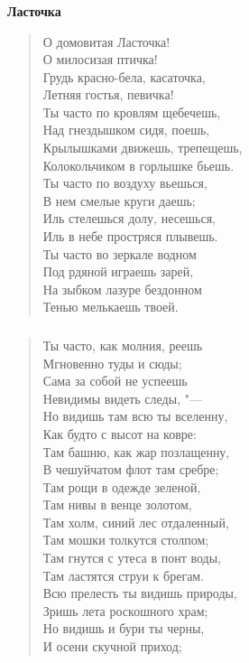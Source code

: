 \documentclass{beamer}
\begin{document}
\begin{frame}
\frametitle{}
\begin{center}
\textbf{Ласточка}
\end{center}

\begin{verse}
О домовитая Ласточка!\\	
О милосизая птичка!	\\			
Грудь красно-бела, касаточка,\\			
Летняя гостья, певичка!			\\	
Ты часто по кровлям щебечешь,\\
Над гнездышком сидя, поешь,\\
Крылышками движешь, трепещешь,\\		
Колокольчиком в горлышке бьешь.	\\	
Ты часто по воздуху вьешься,\\
В нем смелые круги даешь;\\
Иль стелешься долу, несешься,\\
Иль в небе простряся плывешь.\\
Ты часто во зеркале водном\\
Под рдяной играешь зарей,\\
На зыбком лазуре бездонном\\
Тенью мелькаешь твоей.
\end{verse}
\end{frame}


\begin{frame}
\frametitle{}

\begin{verse}
Ты часто, как молния, реешь\\
Мгновенно туды и сюды;\\
Сама за собой не успеешь\\
Невидимы видеть следы, "---\\
Но видишь там всю ты вселенну,\\
Как будто с высот на ковре:\\
Там башню, как жар позлащенну,\\
В чешуйчатом флот там сребре;\\
Там рощи в одежде зеленой,\\
Там нивы в венце золотом,\\
Там холм, синий лес отдаленный,\\
Там мошки толкутся столпом;\\
Там гнутся с утеса в понт воды,\\
Там ластятся струи к брегам.\\
Всю прелесть ты видишь природы,\\
Зришь лета роскошного храм;\\
Но видишь и бури ты черны,\\
И осени скучной приход;
\end{verse}
\end{frame}
\end{document}
